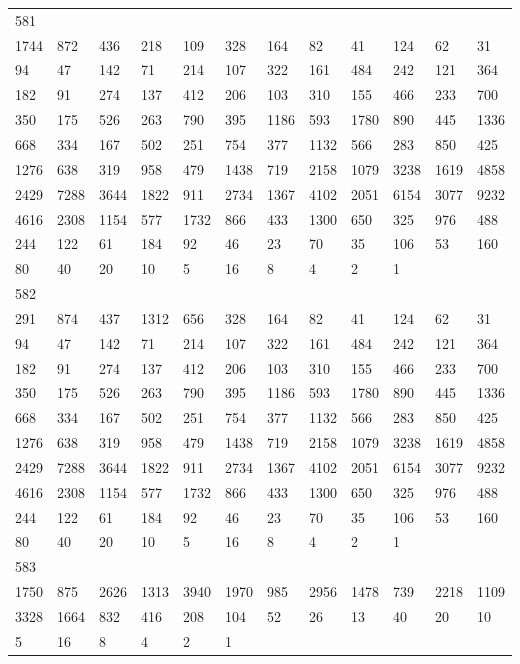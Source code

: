 \begin{longtable}{llllllllllll}
581&&&&&&&&&&&\\
1744& 872& 436& 218& 109& 328& 164& 82& 41& 124& 62& 31\\
94& 47& 142& 71& 214& 107& 322& 161& 484& 242& 121& 364\\
182& 91& 274& 137& 412& 206& 103& 310& 155& 466& 233& 700\\
350& 175& 526& 263& 790& 395& 1186& 593& 1780& 890& 445& 1336\\
668& 334& 167& 502& 251& 754& 377& 1132& 566& 283& 850& 425\\
1276& 638& 319& 958& 479& 1438& 719& 2158& 1079& 3238& 1619& 4858\\
2429& 7288& 3644& 1822& 911& 2734& 1367& 4102& 2051& 6154& 3077& 9232\\
4616& 2308& 1154& 577& 1732& 866& 433& 1300& 650& 325& 976& 488\\
244& 122& 61& 184& 92& 46& 23& 70& 35& 106& 53& 160\\
80& 40& 20& 10& 5& 16& 8& 4& 2& 1& \\

582&&&&&&&&&&&\\
291& 874& 437& 1312& 656& 328& 164& 82& 41& 124& 62& 31\\
94& 47& 142& 71& 214& 107& 322& 161& 484& 242& 121& 364\\
182& 91& 274& 137& 412& 206& 103& 310& 155& 466& 233& 700\\
350& 175& 526& 263& 790& 395& 1186& 593& 1780& 890& 445& 1336\\
668& 334& 167& 502& 251& 754& 377& 1132& 566& 283& 850& 425\\
1276& 638& 319& 958& 479& 1438& 719& 2158& 1079& 3238& 1619& 4858\\
2429& 7288& 3644& 1822& 911& 2734& 1367& 4102& 2051& 6154& 3077& 9232\\
4616& 2308& 1154& 577& 1732& 866& 433& 1300& 650& 325& 976& 488\\
244& 122& 61& 184& 92& 46& 23& 70& 35& 106& 53& 160\\
80& 40& 20& 10& 5& 16& 8& 4& 2& 1& \\

583&&&&&&&&&&&\\
1750& 875& 2626& 1313& 3940& 1970& 985& 2956& 1478& 739& 2218& 1109\\
3328& 1664& 832& 416& 208& 104& 52& 26& 13& 40& 20& 10\\
5& 16& 8& 4& 2& 1& \\


\end{longtable}
